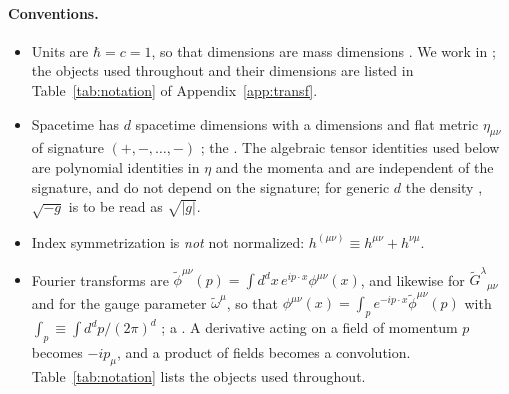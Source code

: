 \documentclass[prd,aps,preprint,superscriptaddress,nofootinbib,amsmath,amssymb,eqsecnum]{revtex4-2}
\newcommand{\tomega}{\tilde{\omega}}
\newcommand{\p}{\tilde{\phi}}
\newcommand{\G}{\tilde{G}}
\newcommand{\ip}[1]{\int_{#1}}
\providecommand{\DIFaddtex}[1]{{\protect\color{blue} \sf #1}} %
\providecommand{\DIFdeltex}[1]{{\protect\color{red} \scriptsize #1}} %
\providecommand{\DIFaddbegin}{} %
\providecommand{\DIFaddend}{} %
\providecommand{\DIFdelbegin}{} %
\providecommand{\DIFdelend}{} %
\providecommand{\DIFadd}[1]{\texorpdfstring{\DIFaddtex{#1}}{#1}} %
\providecommand{\DIFdel}[1]{\texorpdfstring{\DIFdeltex{#1}}{}} %
\begin{document}
\paragraph{Conventions.}
\DIFaddbegin \begin{itemize}
\item \DIFaddend Units are $\hbar=c=1$, so that dimensions are mass dimensions\DIFdelbegin \DIFdel{. We
work in }\DIFdelend \DIFaddbegin \DIFadd{; the objects used
throughout and their dimensions are listed in Table~\ref{tab:notation} of
Appendix~\ref{app:transf}.
}\item \DIFadd{Spacetime has }\DIFaddend $d$ \DIFdelbegin \DIFdel{spacetime dimensions with a }\DIFdelend \DIFaddbegin \DIFadd{dimensions and }\DIFaddend flat metric $\eta_{\mu\nu}$ of signature
$(+,-,\dots,-)$\DIFdelbegin \DIFdel{; the }\DIFdelend \DIFaddbegin \DIFadd{. The }\DIFaddend algebraic tensor identities used below are polynomial \DIFdelbegin \DIFdel{identities }\DIFdelend in $\eta$ and the
momenta and \DIFdelbegin \DIFdel{are independent of the signature, and }\DIFdelend \DIFaddbegin \DIFadd{do not depend on the signature; }\DIFaddend for generic $d$\DIFdelbegin \DIFdel{the density
}\DIFdelend \DIFaddbegin \DIFadd{, }\DIFaddend $\sqrt{-g}$ is \DIFdelbegin \DIFdel{to be }\DIFdelend read as
$\sqrt{|g|}$.
\DIFaddbegin \item \DIFaddend Index symmetrization is \DIFdelbegin \DIFdel{\emph{not} }\DIFdelend \DIFaddbegin \DIFadd{not }\DIFaddend normalized: $h^{(\mu\nu)}\equiv h^{\mu\nu}+h^{\nu\mu}$.
\DIFaddbegin \item \DIFaddend Fourier transforms are $\p^{\mu\nu}(p)=\int d^dx\,e^{ip\cdot x}\phi^{\mu\nu}(x)$, and
likewise for $\G^{\lambda}{}_{\mu\nu}$ and for the gauge parameter $\tomega^\mu$, \DIFdelbegin \DIFdel{so that
$\phi^{\mu\nu}(x)=\ip{p}e^{-ip\cdot x}\p^{\mu\nu}(p)$ }\DIFdelend with
$\ip{p}\equiv\int d^dp/(2\pi)^d$\DIFdelbegin \DIFdel{;
a }\DIFdelend \DIFaddbegin \DIFadd{. A }\DIFaddend derivative acting on a field of momentum $p$ becomes
$-ip_\mu$, and a product of fields becomes a convolution.
\DIFdelbegin \DIFdel{Table~\ref{tab:notation} lists the objects used throughout.
}\DIFdelend \DIFaddbegin \end{itemize}
\DIFaddend 
\end{document}
